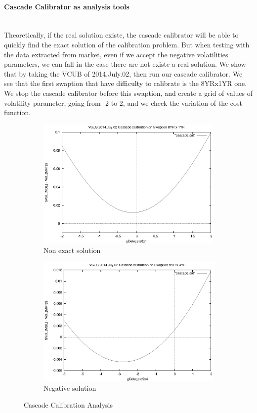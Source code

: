 \documentclass[a4paper,10pt]{article}
\begin{document}
\paragraph{Cascade Calibrator as analysis tools} \mbox{} \\
Theoretically, if the real solution existe, the cascade calibrator will be able to quickly find the exact solution of the calibration problem. But when testing with the data extracted from market, even if we accept the negative volatilities parameters, we can fall in the case there are not existe a real solution. We show that by taking the VCUB of 2014.July.02, then run our cascade calibrator. We see that the first swaption that have difficulty to calibrate is the 8YRx1YR one. We stop the cascade calibrator before this swaption, and create a grid of values of volatility parameter, going from -2 to 2, and we check the variation of the cost function.
\begin{figure}[h]
\begin{subfigure}{.5\textwidth}
  \centering
  \includegraphics[scale=0.5]{CascadeNonSolution}
  \caption{Non exact solution}
  \label{fig:nonsolution}
\end{subfigure}%
\begin{subfigure}{.5\textwidth}
  \centering
  \includegraphics[scale=0.5]{CascadeNegativeSolution}
  \caption{Negative solution}
  \label{fig:negativesolution}
\end{subfigure}
\caption{Cascade Calibration Analysis}
\end{figure}
\end{document}
